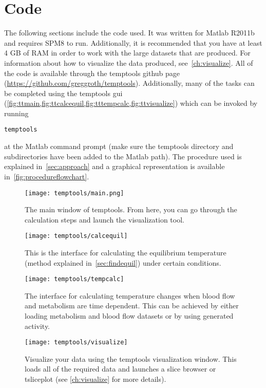 \appendix
\addappheadtotoc
\chapter{Code}
\label{appendix:code}
The following sections include the code used.  It was written for Matlab R2011b and requires SPM8 to run.  Additionally, it is recommended that you have at least 4 GB of RAM in order to work with the large datasets that are produced.  For information about how to visualize the data produced, see~\cref{ch:visualize}.  All of the code is available through the temptools github page (\url{https://github.com/greggroth/temptools}).  Additionally, many of the tasks can be completed using the temptools gui (\cref{fig:ttmain,fig:ttcalcequil,fig:tttempcalc,fig:ttvisualize}) which can be invoked by running
\begin{lstlisting}[style=snippet]
  temptools
\end{lstlisting}
at the Matlab command prompt (make sure the temptools directory and subdirectories have been added to the Matlab path).  The procedure used is explained in~\cref{sec:approach} and a graphical representation is available in~\cref{fig:procedureflowchart}.
\begin{figure}[hbt]
  \centering
    \caption[temptools: main window]{\label{fig:ttmain} The main window of temptools.  From here, you can go through the calculation steps and launch the visualization tool.}
    \texttt{[image: temptools/main.png]}
  \centering
\end{figure}
\begin{figure}[hbt]
  \centering
    \caption[temptools: calculate the equilibrium temperature window]{\label{fig:ttcalcequil} This is the interface for calculating the equilibrium temperature (method explained in~\cref{sec:findequil}) under certain conditions.}
    \texttt{[image: temptools/calcequil]}
  \centering
\end{figure}
\begin{figure}[hbt]
  \centering
    \caption[temptools: calculate temperature during activity]{\label{fig:tttempcalc} The interface for calculating temperature changes when blood flow and metabolism are time dependent.  This can be achieved by either loading metabolism and blood flow datasets or by using generated activity.}
    \texttt{[image: temptools/tempcalc]}
  \centering
\end{figure}
\begin{figure}[hbt]
  \centering
    \caption[temptools: visualize the data]{\label{fig:ttvisualize} Visualize your data using the temptools visualization window.  This loads all of the required data and launches a slice browser or tsliceplot (see \cref{ch:visualize} for more details).}
    \texttt{[image: temptools/visualize]}
  \centering
\end{figure}
